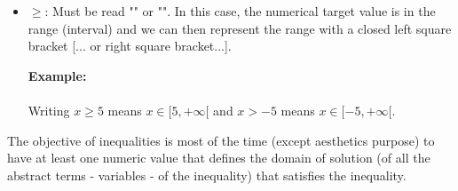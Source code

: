 \begin{itemize}
		\item $\geq$: Must be read "" or "". In this case, the numerical target value is in the range (interval) and we can then represent the range  with a closed left square bracket [... or right square bracket...].
		
		\begin{tcolorbox}[colframe=black,colback=white,sharp corners]
	\textbf{{\Large {}}Example:}\\\\
		Writing $x\geq 5$ means $x \in [5,+\infty[$ and $x>-5$ means $x \in [-5,+\infty[$.
		\end{tcolorbox}
	
	\end{itemize}
	The objective of inequalities is most of the time (except aesthetics purpose) to have at least one numeric value that defines the domain of solution (of all the abstract terms - variables - of the inequality) that satisfies the inequality.
	
